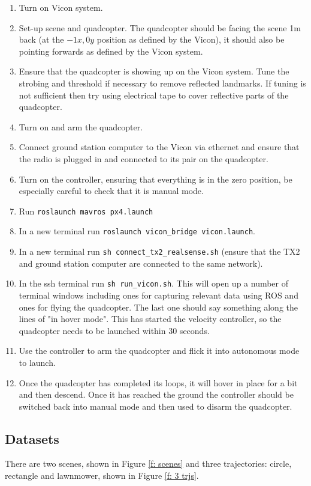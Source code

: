 \documentclass[12pt,a4paper]{article}
\begin{document}
    \begin{enumerate}
    \item Turn on Vicon system.
    \item Set-up scene and quadcopter. The quadcopter should be facing the scene 1m back (at the $-1x, 0y$ position as defined by the Vicon), it should also be pointing forwards as defined by the Vicon system.
    \item Ensure that the quadcopter is showing up on the Vicon system. Tune the strobing and threshold if necessary to remove reflected landmarks. If tuning is not sufficient then try using electrical tape to cover reflective parts of the quadcopter.
    \item Turn on and arm the quadcopter.
    \item Connect ground station computer to the Vicon via ethernet and ensure that the radio is plugged in and connected to its pair on the quadcopter.
    \item Turn on the controller, ensuring that everything is in the zero position, be especially careful to check that it is manual mode.
    \item Run \verb|roslaunch mavros px4.launch|
    \item In a new terminal run \verb|roslaunch vicon_bridge vicon.launch|.
    \item In a new terminal run \verb|sh connect_tx2_realsense.sh| (ensure that the TX2 and ground station computer are connected to the same network).
    \item In the ssh terminal run \verb|sh run_vicon.sh|. This will open up a number of terminal windows including ones for capturing relevant data using ROS and ones for flying the quadcopter. The last one should say something along the lines of "in hover mode". This has started the velocity controller, so the quadcopter needs to be launched within 30 seconds.
    \item Use the controller to arm the quadcopter and flick it into autonomous mode to launch.
    \item Once the quadcopter has completed its loops, it will hover in place for a bit and then descend. Once it has reached the ground the controller should be switched back into manual mode and then used to disarm the quadcopter.
    \end{enumerate}


  \subsection{Datasets}
    \label{ssec: datasets}
    There are two scenes, shown in Figure \ref{f: scenes} and three trajectories: circle, rectangle and lawnmower, shown in Figure \ref{f: 3 trjs}. 
\end{document}

